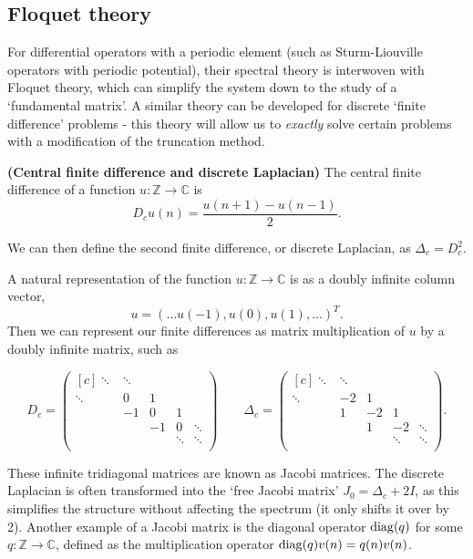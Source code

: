 \documentclass[../main.tex]{subfiles}
\begin{document}
\subsection{Floquet theory}
For differential operators with a periodic element (such as Sturm-Liouville operators with periodic potential), their spectral theory is interwoven with Floquet theory, which can simplify the system down to the study of a `fundamental matrix'. A similar theory can be developed for discrete `finite difference' problems - this theory will allow us to \emph{exactly} solve certain problems with a modification of the truncation method.

\begin{definition}{\textbf{(Central finite difference and discrete Laplacian)}}
The central finite difference of a function $u: \mathbb{Z} \rightarrow \mathbb{C}$ is 
$$D_c u (n) = \frac{u(n+1) - u(n-1)}{2}.$$

We can then define the second finite difference, or discrete Laplacian, as $\Delta_c = D_c^2$.
\end{definition}
A natural representation of the function $u: \mathbb{Z} \rightarrow \mathbb{C}$ is as a doubly infinite column vector,
$$u = (\hdots u(-1), u(0), u(1),\hdots)^T.$$
Then we can represent our finite differences as matrix multiplication of $u$ by a doubly infinite matrix, such as

$$ 
D_c = \begin{pmatrix*}[c]
\ddots & \ddots & & & \\
\ddots & 0 & 1 & & \\
& -1 & 0 & 1 & \\
& & -1 & 0 & \ddots \\
& & & \ddots & \ddots \\
\end{pmatrix*}\quad\quad
\Delta_c =
\begin{pmatrix*}[c]
\ddots & \ddots & & & \\
\ddots & -2 & 1 & & \\
& 1 & -2 & 1 & \\
& & 1 & -2 & \ddots \\
& & & \ddots & \ddots \\
\end{pmatrix*}.
$$

These infinite tridiagonal matrices are known as Jacobi matrices. The discrete Laplacian is often transformed into the `free Jacobi matrix' $J_0 = \Delta_c + 2I$, as this simplifies the structure without affecting the spectrum (it only shifts it over by 2). Another example of a Jacobi matrix is the diagonal operator $\mathrm{diag}(q)$ for some $q: \mathbb{Z} \rightarrow \mathbb{C}$, defined as the multiplication operator $\mathrm{diag}(q)v(n) = q(n)v(n)$.
\end{document}
